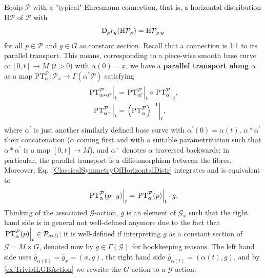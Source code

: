 \documentclass[reqno,a4paper,oneside]{amsart}
\theoremstyle{plain}
\theoremstyle{remark}
\theoremstyle{definition}
\begin{document}
Equip $\mathcal{P}$ with a "typical" Ehresmann connection, that is, a horizontal distribution $\mathrm{H}\mathcal{P}$ of $\mathcal{P}$ with
\begin{equation}\label{ClassicalSymmetryOfHorizontalDistr}
\mathrm{D}_pr_g\mleft(\mathrm{H}\mathcal{P}_p\mright) = \mathrm{H}\mathcal{P}_{p \cdot g}
\end{equation}
for all $p \in \mathcal{P}$ and $g \in G$ as constant section. Recall that a connection is 1:1 to its parallel transport. This means, corresponding to a piece-wise smooth base curve $\alpha\colon [0, t] \to M$ ($t > 0$) with $\alpha(0) = x$, we have a \textbf{parallel transport along $\alpha$} as a map $\mathrm{PT}_\alpha^{\mathcal{P}}\colon \mathcal{P}_x \to \Gamma(\alpha^*\mathcal{P})$ satisfying
\begin{align}\label{PTProp1}
\mleft.\mathrm{PT}^{\mathcal{P}}_{\alpha*\alpha^\prime}\mright|_t
&=
\mleft.\mathrm{PT}^{\mathcal{P}}_{\alpha^\prime}\mright|_t
	\circ \mleft.\mathrm{PT}_\alpha^{\mathcal{P}}\mright|_t,\\
\mleft.\mathrm{PT}_{\alpha^-}^{\mathcal{P}}\mright|_t
&=
\mleft.\mleft( \mathrm{PT}_\alpha^{\mathcal{P}} \mright)^{-1}\mright|_t,\label{PTProp2}
\end{align}
where $\alpha^\prime$ is just another similarly defined base curve with $\alpha^\prime(0)= \alpha(t)$, $\alpha*\alpha^\prime$ their concatenation ($\alpha$ coming first and with a suitable parametrization such that $\alpha*\alpha^\prime$ is a map $[0, t] \to M$), and $\alpha^-$ denotes $\alpha$ traversed backwards; in particular, the parallel transport is a diffeomorphism between the fibres. Moreover, Eq.\ \eqref{ClassicalSymmetryOfHorizontalDistr} integrates and is equivalent to
\begin{equation}\label{ClassicalSymmetryofPTs}
\mleft.\mathrm{PT}_\alpha^{\mathcal{P}}(p \cdot g)\mright|_t
=
\mleft.\mathrm{PT}_\alpha^{\mathcal{P}}(p)\mright|_t \cdot g.
\end{equation}
Thinking of the associated $\mathcal{G}$-action, $g$ is an element of $\mathcal{G}_x$ such that the right hand side is in general not well-defined
anymore due to the fact that $\mleft.\mathrm{PT}_\alpha^{\mathcal{P}}(p)\mright|_t \in \mathcal{P}_{\alpha(t)}$; it is well-defined if interpreting $g$ as a constant section of $\mathcal{G} = M \times G$, denoted now by $\overline{g} \in \Gamma(\mathcal{G})$ for bookkeeping reasons. The left hand side uses $\overline{g}_{\alpha(0)} = \overline{g}_{x} = (x, g)$, the right hand side $\overline{g}_{\alpha(t)} = (\alpha(t), g)$, and by \ref{ex:TrivialLGBAction} we rewrite the $G$-action to a $\mathcal{G}$-action:
\end{document}
